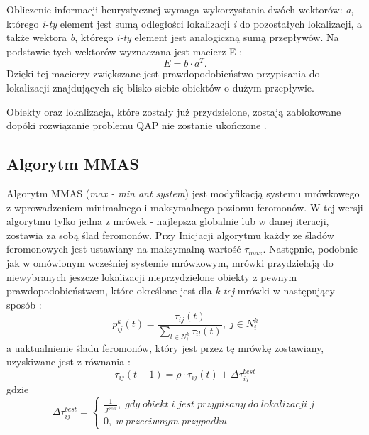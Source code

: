 Obliczenie informacji heurystycznej wymaga wykorzystania dwóch wektorów: \textit{a}, którego \textit{i-ty} element jest sumą odległości lokalizacji \textit{i} do pozostałych lokalizacji, a także wektora \textit{b}, którego \textit{i-ty} element jest analogiczną sumą przepływów. Na podstawie tych wektorów wyznaczana jest macierz E \cite{FILIP_STADNE}:
\newline
\begin{equation}
E=b \cdot a^T.
\end{equation}
\newline
Dzięki tej macierzy zwiększane jest prawdopodobieństwo przypisania do lokalizacji znajdujących się blisko siebie obiektów o dużym przepływie.

Obiekty oraz lokalizacja, które zostały już przydzielone, zostają zablokowane dopóki rozwiązanie problemu QAP nie zostanie ukończone \cite{FILIP_STADNE}.

\subsection{Algorytm MMAS}
Algorytm MMAS (\textit{max - min ant system}) jest modyfikacją systemu mrówkowego z wprowadzeniem minimalnego i maksymalnego poziomu feromonów. W tej wersji algorytmu tylko jedna z mrówek - najlepsza globalnie lub w danej iteracji, zostawia za sobą ślad feromonów. Przy Inicjacji algorytmu każdy ze śladów feromonowych jest ustawiany na maksymalną wartość $\tau_{max}$. Następnie, podobnie jak w omówionym wcześniej systemie mrówkowym, mrówki przydzielają do niewybranych jeszcze lokalizacji nieprzydzielone obiekty z pewnym prawdopodobieństwem, które określone jest dla \textit{k-tej} mrówki w następujący sposób \cite{FILIP_STADNE}:
\newline
\begin{equation}
p_{ij}^k(t)=\frac{\tau_{ij}(t)}{\sum\limits_{l\in N_i^k} \tau_{il}(t)}, \; j \in N_i^k
\end{equation}
\newline
a uaktualnienie śladu feromonów, który jest przez tę mrówkę zostawiany, uzyskiwane jest z równania \cite{FILIP_STADNE}:
\newline
\begin{equation}
\tau_{ij}(t+1)=\rho \cdot \tau_{ij}(t)+\Delta \tau_{ij}^{best}
\end{equation}
\newline
gdzie
\newline
\begin{equation}
\Delta \tau_{ij}^{best} = \left\{ \begin{array}{ccc} \frac{1}{J^{best}}, \; gdy \; obiekt \; i \; jest \; przypisany \; do \; lokalizacji \; j \\ 0, \; w \; przeciwnym \;  przypadku \end{array} \right.
\end{equation}
\newline

